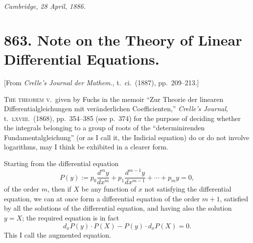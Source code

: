\documentclass[11pt]{article}
\begin{document}
\medskip

\begin{flushright}\textit{Cambridge, 28 April, 1886.}\end{flushright}

\vfill
\newpage

\section*{863. Note on the Theory of Linear Differential Equations.}

\begin{flushright}\small
[From \textit{Crelle's Journal der Mathem.}, t.~ci.\ (1887), pp.~209--213.]
\end{flushright}

\medskip

\noindent\textsc{The theorem v.}\ given by Fuchs in the memoir ``Zur Theorie der linearen Differentialgleichungen mit ver\"anderlichen Coefficienten,'' \textit{Crelle's Journal}, t.~\textsc{lxviii}.\ (1868), pp.~354--385 (see p.~374) for the purpose of deciding whether the integrals belonging to a group of roots of the ``determinirenden Fundamentalgleichung'' (or as I call it, the Indicial equation) do or do not involve logarithms, may I think be exhibited in a clearer form.

Starting from the differential equation
\[
P(y) := p_{0}\frac{d^{m}y}{dx^{m}} + p_{1}\frac{d^{m-1}y}{dx^{m-1}} + \cdots + p_{m}y = 0,
\]
of the order $m$, then if $X$ be any function of $x$ not satisfying the differential equation, we can at once form a differential equation of the order $m+1$, satisfied by all the solutions of the differential equation, and having also the solution $y = X$; the required equation is in fact
\[
d_{x}P(y)\cdot P(X) - P(y)\cdot d_{x}P(X) = 0.
\]
This I call the augmented equation.
\end{document}
